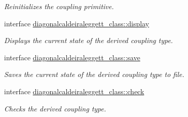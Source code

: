 \begin{DoxyCompactItemize}
\begin{DoxyCompactList}\small\item\em Reinitializes the coupling primitive. \end{DoxyCompactList}\item 
interface \hyperlink{interfacediagonalcaldeiraleggett__class_1_1display}{diagonalcaldeiraleggett\+\_\+class\+::display}
\begin{DoxyCompactList}\small\item\em Displays the current state of the derived coupling type. \end{DoxyCompactList}\item 
interface \hyperlink{interfacediagonalcaldeiraleggett__class_1_1save}{diagonalcaldeiraleggett\+\_\+class\+::save}
\begin{DoxyCompactList}\small\item\em Saves the current state of the derived coupling type to file. \end{DoxyCompactList}\item 
interface \hyperlink{interfacediagonalcaldeiraleggett__class_1_1check}{diagonalcaldeiraleggett\+\_\+class\+::check}
\begin{DoxyCompactList}\small\item\em Checks the derived coupling type. \end{DoxyCompactList}\end{DoxyCompactItemize}
